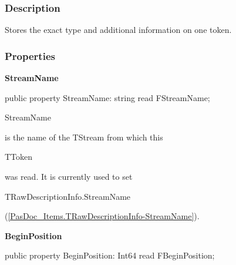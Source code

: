 \documentclass{report}
\newif\ifpdf
\begin{document}
\subsubsection*{\large{\textbf{Description}}\normalsize\hspace{1ex}\hfill}
Stores the exact type and additional information on one token.\subsubsection*{\large{\textbf{Properties}}\normalsize\hspace{1ex}\hfill}
\begin{list}{}{
\setlength{\itemindent}{0cm}
\setlength{\listparindent}{0cm}
\setlength{\leftmargin}{\evensidemargin}
\addtolength{\leftmargin}{\tmplength}
\settowidth{\labelsep}{X}
\addtolength{\leftmargin}{\labelsep}
\setlength{\labelwidth}{\tmplength}
}
\label{PasDoc_Tokenizer.TToken-StreamName}
\item[\textbf{StreamName}\hfill]
\ifpdf
\begin{flushleft}
\fi
\begin{ttfamily}
public property StreamName: string read FStreamName;\end{ttfamily}

\ifpdf
\end{flushleft}
\fi


\par \begin{ttfamily}StreamName\end{ttfamily} is the name of the TStream from which this \begin{ttfamily}TToken\end{ttfamily} was read. It is currently used to set \begin{ttfamily}TRawDescriptionInfo.StreamName\end{ttfamily}(\ref{PasDoc_Items.TRawDescriptionInfo-StreamName}).\label{PasDoc_Tokenizer.TToken-BeginPosition}
\item[\textbf{BeginPosition}\hfill]
\ifpdf
\begin{flushleft}
\fi
\begin{ttfamily}
public property BeginPosition: Int64 read FBeginPosition;\end{ttfamily}

\ifpdf
\end{flushleft}
\fi



\end{list}
\end{document}
